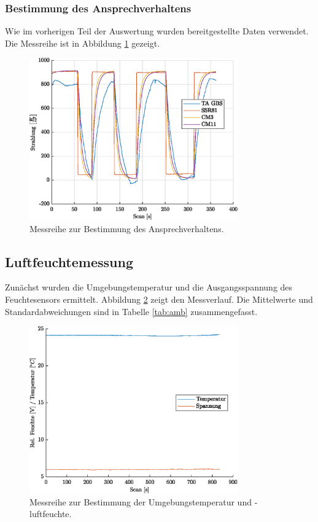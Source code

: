\subsubsection{Bestimmung des Ansprechverhaltens}
Wie im vorherigen Teil der Auswertung wurden bereitgestellte Daten verwendet. Die Messreihe ist in Abbildung \ref{fig:response} gezeigt.
\begin{figure}[H]
	\centering
	\includegraphics[width=0.8\textwidth]{../DATA/Messreihe_Ansprechzeit.eps}
	\caption[Messreihe zur Bestimmung des Ansprechverhaltens.]{Messreihe zur Bestimmung des Ansprechverhaltens.}
	\label{fig:response}
\end{figure}

\subsection{Luftfeuchtemessung}
Zunächst wurden die Umgebungstemperatur und die Ausgangsspannung des Feuchtesensors ermittelt. Abbildung \ref{fig:amb} zeigt den Messverlauf. Die Mittelwerte und Standardabweichungen sind in Tabelle \ref{tab:amb} zusammengefasst.

\begin{figure}[H]
	\centering
	\includegraphics[width=0.8\textwidth]{../DATA/Messreihe_Umgebung.eps}
	\caption[Messreihe Umgebung]{Messreihe zur Bestimmung der Umgebungstemperatur und -luftfeuchte.}
	\label{fig:amb}
\end{figure}


